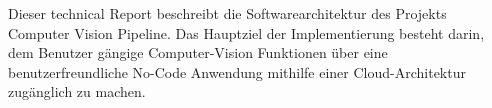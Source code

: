 Dieser technical Report beschreibt die Softwarearchitektur des Projekts \glqq Computer Vision Pipeline\grqq{}. Das Hauptziel der Implementierung besteht darin, dem Benutzer gängige Computer-Vision Funktionen über eine benutzerfreundliche No-Code Anwendung mithilfe einer Cloud-Architektur zugänglich zu machen. 